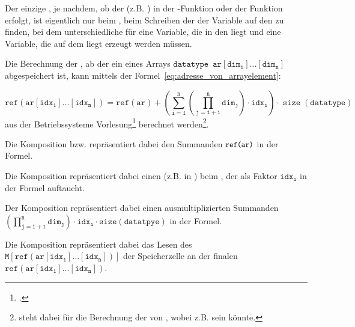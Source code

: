 Der einzige , je nachdem, ob der  (z.B. ) in der  -Funktion oder der Funktion  erfolgt, ist eigentlich nur beim , beim Schreiben der  der Variable  auf den  zu finden, bei dem unterschiedliche  für eine Variable, die in den  liegt und eine Variable, die auf dem  liegt erzeugt werden müssen.

\begin{Special_Paragraph}
  Die Berechnung der , ab der ein  eines Arrays $\mathtt{datatype\enspace ar[dim_1]\ldots[dim_n]}$ abgespeichert ist, kann mittels der Formel~\ref{eq:adresse_von_arrayelement}:


  \begin{equation}
  \mathtt{ref(ar[idx_1]\ldots[idx_n]) = ref(ar) + \left(\sum_{i=1}^{n}\left(\prod_{j=i+1}^{n} dim_{j}\right) \cdot idx_{i}\right) \cdot \operatorname{size}(datatype)}
    \label{eq:adresse_von_arrayelement}
  \end{equation}
  aus der Betriebssysteme Vorlesung\footcite{scholl_betriebssysteme_2020} berechnet werden\footnote{ steht dabei für die Berechnung der  von , wobei  z.B.  sein könnte.}.

  Die Komposition  bzw.  repräsentiert dabei den Summanden ${\small\texttt{ref(ar)}}$ in der Formel.

  Die Komposition  repräsentiert dabei einen  (z.B.  in ) beim , der als Faktor $\mathtt{idx_i}$ in der Formel auftaucht.

  Der Komposition  repräsentiert dabei einen ausmultiplizierten Summanden $\mathtt{\left(\prod_{j=i+1}^{n} dim_{j}\right) \cdot idx_{i} \cdot size(datatpye)}$ in der Formel.

Die Komposition  repräsentiert dabei das Lesen des  $\mathtt{M\left[ref(ar[idx_1]\ldots[idx_n])\right]}$ der Speicherzelle an der finalen   $\mathtt{ref(ar[idx_1]\ldots[idx_n])}$.
\end{Special_Paragraph}

